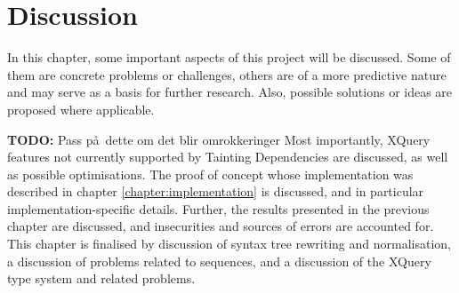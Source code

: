 \chapter{Discussion}
\label{chapter:discussion}
In this chapter, some important aspects of this project will be discussed. Some
of them are concrete problems or challenges, others are of a more predictive
nature and may serve as a basis for further research. Also, possible
solutions or ideas are proposed where applicable. 

\textbf{\LARGE TODO:} Pass p\aa~dette om det blir omrokkeringer
Most importantly, XQuery features not
currently supported by Tainting Dependencies are discussed, as well as
possible optimisations. The proof of concept whose implementation was
described in chapter \ref{chapter:implementation} is discussed, and in
particular implementation-specific details. Further, the results presented in
the previous chapter are discussed, and insecurities and sources of errors are
accounted for. This chapter is finalised by discussion of syntax tree rewriting
and normalisation, a discussion of problems related to sequences, and a
discussion of the XQuery type system and related problems.










